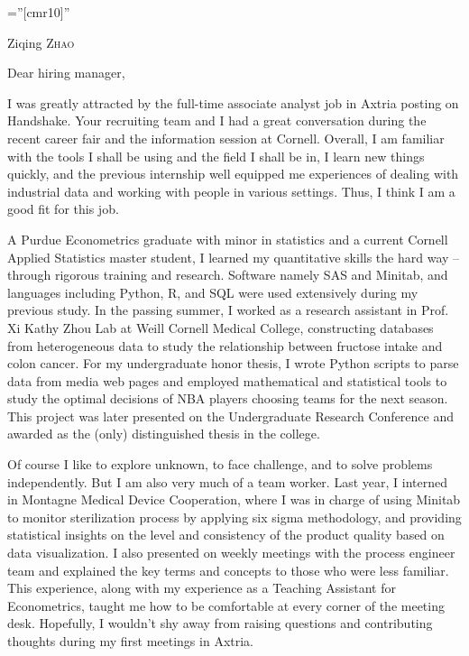 \documentclass[letterpaper,10pt]{article}
\begin{document}

\pagestyle{empty} %

\font\fb=''[cmr10]'' %

\par{\centering
		{ \Huge  Ziqing \textsc{Zhao}
	}\bigskip\par}
	


Dear hiring manager,

I was greatly attracted by the full-time associate analyst job in Axtria posting on Handshake. Your recruiting team and I had a great conversation during the recent career fair and the information session at Cornell. Overall, I am familiar with the tools I shall be using and the field I shall be in, I learn new things quickly, and the previous internship well equipped me experiences of dealing with industrial data and working with people in various settings. Thus, I think I am a good fit for this job.

A Purdue Econometrics graduate with minor in statistics and a current Cornell Applied Statistics master student, I learned my quantitative skills the hard way -- through rigorous training and research. Software namely SAS and Minitab, and languages including Python, R, and SQL were used extensively during my previous study. In the passing summer, I worked as a research assistant in Prof. Xi Kathy Zhou Lab at Weill Cornell Medical College, constructing databases from heterogeneous data to study the relationship between fructose intake and colon cancer. For my undergraduate honor thesis, I wrote Python scripts to parse data from media web pages and employed mathematical and statistical tools to study the optimal decisions of NBA players choosing teams for the next season. This project was later presented on the Undergraduate Research Conference and awarded as the (only) distinguished thesis in the college.

Of course I like to explore unknown, to face challenge, and to solve problems independently. But I am also very much of a team worker. Last year, I interned in Montagne Medical Device Cooperation, where I was in charge of using Minitab to monitor sterilization process by applying six sigma methodology, and providing statistical insights on the level and consistency of the product quality based on data visualization. I also presented on  weekly meetings with the process engineer team and explained the key terms and concepts to those who were less familiar. This experience, along with my experience as a Teaching Assistant for Econometrics, taught me how to be comfortable at every corner of the meeting desk. Hopefully, I wouldn’t shy away from raising questions and contributing thoughts during my first meetings in Axtria.
\end{document}
